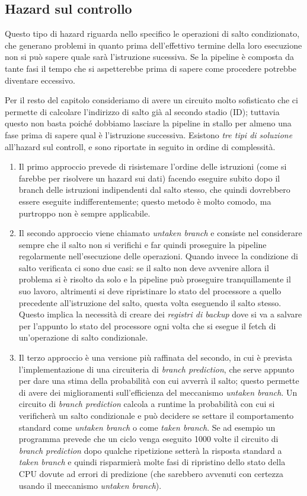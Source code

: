 \documentclass[class=book, crop=false, oneside]{standalone}
\begin{document}
\subsection{Hazard sul controllo}
Questo tipo di hazard riguarda nello specifico le operazioni di salto condizionato, che generano problemi in quanto prima dell'effettivo termine della loro esecuzione non si può sapere quale sarà l'istruzione sucessiva. Se la pipeline è composta da tante fasi il tempo che si aspetterebbe prima di sapere come procedere potrebbe diventare eccessivo.

Per il resto del capitolo consideriamo di avere un circuito molto sofisticato che ci permette di calcolare l’indirizzo di salto già al secondo stadio (ID); tuttavia questo non basta poiché dobbiamo lasciare la pipeline in stallo per almeno una fase prima di sapere qual è l'istruzione successiva. Esistono \emph{tre tipi di soluzione} all'hazard sul controll, e sono riportate in seguito in ordine di complessità.

\begin{enumerate}
	\item Il primo approccio prevede di risistemare l'ordine delle istruzioni (come si farebbe per risolvere un hazard sui dati) facendo eseguire subito dopo il branch delle istruzioni indipendenti dal salto stesso, che quindi dovrebbero essere eseguite indifferentemente; questo metodo è molto comodo, ma purtroppo non è sempre applicabile.
	\item Il secondo approccio viene chiamato \emph{untaken branch} e consiste nel considerare sempre che il salto non si verifichi e far quindi proseguire la pipeline regolarmente nell'esecuzione delle operazioni. Quando invece la condizione di salto verificata ci sono due casi: se il salto non deve avvenire allora il problema si è risolto da solo e la pipeline può proseguire tranquillamente il suo lavoro, altrimenti si deve ripristinare lo stato del processore a quello precedente all'istruzione del salto, questa volta eseguendo il salto stesso. Questo implica la necessità di creare dei \emph{registri di backup} dove si va a salvare per l'appunto lo stato del processore ogni volta che si esegue il fetch di un'operazione di salto condizionale.
	\item Il terzo approccio è una versione più raffinata del secondo, in cui è prevista l'implementazione di una circuiteria di \emph{branch prediction}, che serve appunto per dare una stima della probabilità con cui avverrà il salto; questo permette di avere dei miglioramenti sull'efficienza del meccanismo \emph{untaken branch}. Un circuito di \emph{branch prediction} calcola a runtime la probabilità con cui si verificherà un salto condizionale e può decidere se settare il comportamento standard come \emph{untaken branch} o come \emph{taken branch}. Se ad esempio un programma prevede che un ciclo venga eseguito 1000 volte il circuito di \emph{branch prediction} dopo qualche ripetizione setterà la risposta standard a \emph{taken branch} e quindi risparmierà molte fasi di ripristino dello stato della CPU dovute ad errori di predizione (che sarebbero avvenuti con certezza usando il meccanismo \emph{untaken branch}).
\end{enumerate}
\end{document}
